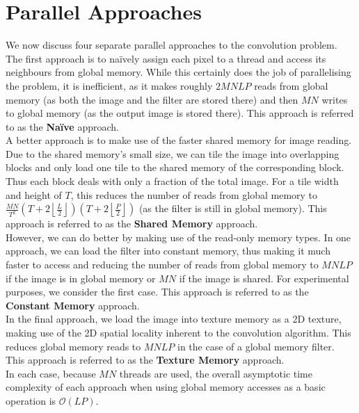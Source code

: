 \documentclass[10pt]{article}
\begin{document}
\section{Parallel Approaches}\label{ParallelApproaches}
We now discuss four separate parallel approaches to the convolution problem.
\\
The first approach is to na\"{i}vely assign each pixel to a thread and access its neighbours from global memory. While this certainly does the job of parallelising the problem, it is inefficient, as it makes roughly $2MNLP$ reads from global memory (as both the image and the filter are stored there) and then $MN$ writes to global memory (as the output image is stored there). This approach is referred to as the \textbf{Na\"{i}ve} approach.
\\
A better approach is to make use of the faster shared memory for image reading. Due to the shared memory's small size, we can tile the image into overlapping blocks and only load one tile to the shared memory of the corresponding block. Thus each block deals with only a fraction of the total image. For a tile width and height of $T$, this reduces the number of reads from global memory to $\frac{MN}{T^2}(T+2\left \lfloor{\frac{L}{2}}\right \rfloor)(T+2\left \lfloor{\frac{P}{2}}\right \rfloor)$ (as the filter is still in global memory). This approach is referred to as the \textbf{Shared Memory} approach.
\\
However, we can do better by making use of the read-only memory types. In one approach, we can load the filter into constant memory, thus making it much faster to access and reducing the number of reads from global memory to $MNLP$ if the image is in global memory or $MN$ if the image is shared. For experimental purposes, we consider the first case. This approach is referred to as the \textbf{Constant Memory} approach.
\\
In the final approach, we load the image into texture memory as a 2D texture, making use of the 2D spatial locality inherent to the convolution algorithm. This reduces global memory reads to $MNLP$ in the case of a global memory filter. This approach is referred to as the \textbf{Texture Memory} approach.
\\
In each case, because $MN$ threads are used, the overall asymptotic time complexity of each approach when using global memory accesses as a basic operation is $\mathcal{O}(LP)$.
\end{document}
